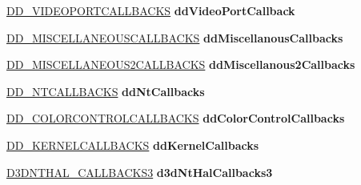 \begin{DoxyCompactItemize}
\hyperlink{struct_d_d___v_i_d_e_o_p_o_r_t_c_a_l_l_b_a_c_k_s}{D\+D\+\_\+\+V\+I\+D\+E\+O\+P\+O\+R\+T\+C\+A\+L\+L\+B\+A\+C\+KS} {\bfseries dd\+Video\+Port\+Callback}
\item 
\mbox{\label{struct___e_d_d___d_i_r_e_c_t_d_r_a_w___g_l_o_b_a_l_a613c6a1032e909fa3abd6278a0531be9}} 
\hyperlink{struct___d_d___m_i_s_c_e_l_l_a_n_e_o_u_s_c_a_l_l_b_a_c_k_s}{D\+D\+\_\+\+M\+I\+S\+C\+E\+L\+L\+A\+N\+E\+O\+U\+S\+C\+A\+L\+L\+B\+A\+C\+KS} {\bfseries dd\+Miscellanous\+Callbacks}
\item 
\mbox{\label{struct___e_d_d___d_i_r_e_c_t_d_r_a_w___g_l_o_b_a_l_aa9ea26c4286671816057fb5525d828b2}} 
\hyperlink{struct___d_d___m_i_s_c_e_l_l_a_n_e_o_u_s2_c_a_l_l_b_a_c_k_s}{D\+D\+\_\+\+M\+I\+S\+C\+E\+L\+L\+A\+N\+E\+O\+U\+S2\+C\+A\+L\+L\+B\+A\+C\+KS} {\bfseries dd\+Miscellanous2\+Callbacks}
\item 
\mbox{\label{struct___e_d_d___d_i_r_e_c_t_d_r_a_w___g_l_o_b_a_l_a9ba14458a4492c8f167f5029e159a1ad}} 
\hyperlink{struct___d_d___n_t_c_a_l_l_b_a_c_k_s}{D\+D\+\_\+\+N\+T\+C\+A\+L\+L\+B\+A\+C\+KS} {\bfseries dd\+Nt\+Callbacks}
\item 
\mbox{\label{struct___e_d_d___d_i_r_e_c_t_d_r_a_w___g_l_o_b_a_l_aeb7ca9086282ae0f317ff6cb6e77359a}} 
\hyperlink{struct___d_d___c_o_l_o_r_c_o_n_t_r_o_l_c_a_l_l_b_a_c_k_s}{D\+D\+\_\+\+C\+O\+L\+O\+R\+C\+O\+N\+T\+R\+O\+L\+C\+A\+L\+L\+B\+A\+C\+KS} {\bfseries dd\+Color\+Control\+Callbacks}
\item 
\mbox{\label{struct___e_d_d___d_i_r_e_c_t_d_r_a_w___g_l_o_b_a_l_a9a4e740f58decbbe77b5ccc84ef180cf}} 
\hyperlink{struct_d_d___k_e_r_n_e_l_c_a_l_l_b_a_c_k_s}{D\+D\+\_\+\+K\+E\+R\+N\+E\+L\+C\+A\+L\+L\+B\+A\+C\+KS} {\bfseries dd\+Kernel\+Callbacks}
\item 
\mbox{\label{struct___e_d_d___d_i_r_e_c_t_d_r_a_w___g_l_o_b_a_l_af17530a2fad6523b33e0fff7d3096c75}} 
\hyperlink{struct___d3_d_n_t_h_a_l___c_a_l_l_b_a_c_k_s3}{D3\+D\+N\+T\+H\+A\+L\+\_\+\+C\+A\+L\+L\+B\+A\+C\+K\+S3} {\bfseries d3d\+Nt\+Hal\+Callbacks3}

\end{DoxyCompactItemize}

